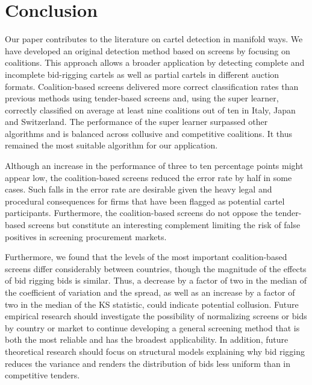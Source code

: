 \documentclass[a4paper,11pt]{article}
\begin{document}
	
	\section{Conclusion}\label{Conclusion}
	Our paper contributes to the literature on cartel detection in manifold ways. We have developed an original detection method based on screens by focusing on coalitions. This approach allows a broader application by detecting complete and incomplete bid-rigging cartels as well as partial cartels in different auction formats. Coalition-based screens delivered more correct classification rates than previous methods using tender-based screens and, using the super learner, correctly classified on average at least nine coalitions out of ten in Italy, Japan and Switzerland. The performance of the super learner surpassed other algorithms and is balanced across collusive and competitive coalitions. It thus remained the most suitable algorithm for our application.
	
	Although an increase in the performance of three to ten percentage points might appear low, the coalition-based screens reduced the error rate by half in some cases. Such falls in the error rate are desirable given the heavy legal and procedural consequences for firms that have been flagged as potential cartel participants. Furthermore, the coalition-based screens do not oppose the tender-based screens but constitute an interesting complement limiting the risk of false positives in screening procurement markets. 
	
	Furthermore, we found that the levels of the most important coalition-based screens differ considerably between countries, though the magnitude of the effects of bid rigging bids is similar. Thus, a decrease by a factor of two in the median of the coefficient of variation and the spread, as well as an increase by a factor of two in the median of the KS statistic, could indicate potential collusion. Future empirical research should investigate the possibility of normalizing screens or bids by country or market to continue developing a general screening method that is both the most reliable and has the broadest applicability. In addition, future theoretical research should focus on structural models explaining why bid rigging reduces the variance and renders the distribution of bids less uniform than in competitive tenders.
	
	
	\newpage
	\bigskip
	
	
	
	
	\bigskip
	
\end{document}
